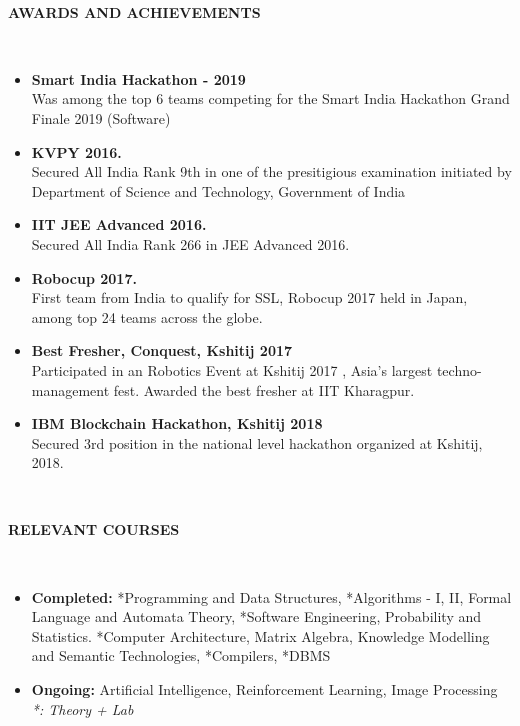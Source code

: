 \documentclass[a4paper,8pt]{article}
\newcommand{\lsep}{-0.5cm}
\newcommand{\resheading}[1]{{\small \colorbox{mygrey}{\begin{minipage}{0.975\textwidth}{\textbf{#1 \vphantom{p\^{E}}}}\end{minipage}}}}
\begin{document}
\hspace{0.5cm}\\[-0.2cm]
\resheading{\textbf{AWARDS AND ACHIEVEMENTS} }\\[\lsep]
\begin{itemize}

\item \noindent \textbf{Smart India Hackathon - 2019} \\
Was among the top 6 teams competing for the Smart India Hackathon Grand Finale 2019 (Software)

\item \noindent \textbf{KVPY 2016.} \\
Secured All India Rank 9th in one of the presitigious examination initiated by Department of Science and Technology, Government of India

\item \noindent \textbf{IIT JEE Advanced 2016.} \\
Secured All India Rank 266 in JEE Advanced 2016.

\item \noindent \textbf{Robocup 2017.} \\
First team from India to qualify for SSL, Robocup 2017 held in Japan, among top 24 teams across the globe.

\item \noindent \textbf{Best Fresher, Conquest, Kshitij 2017} \\
Participated in an Robotics Event at Kshitij 2017 , Asia’s largest techno-management fest. Awarded the best fresher at IIT Kharagpur.

\item \noindent \textbf{IBM Blockchain Hackathon, Kshitij 2018} \\
Secured 3rd position in the national level hackathon organized at Kshitij, 2018.

\end{itemize}

\hspace{0.5cm}\\[-0.2cm]
\resheading{\textbf{RELEVANT COURSES} }\\[\lsep]
\begin{itemize}
\item \noindent \textbf{Completed: } *Programming and Data Structures, *Algorithms - I, II, Formal Language and Automata Theory, *Software Engineering,
Probability and Statistics. *Computer Architecture, Matrix Algebra, Knowledge Modelling and Semantic Technologies, *Compilers, *DBMS

\item \noindent \textbf{Ongoing: } Artificial Intelligence, Reinforcement Learning, Image Processing \\
\textit{*: Theory + Lab}
\end{itemize}
\end{document}
